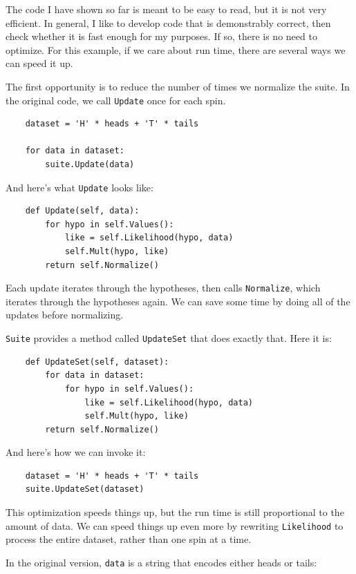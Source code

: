 \documentclass[12pt]{book}
\begin{document}
The code I have shown so far is meant to be easy to read, but it
is not very efficient.  In general, I like to develop code that
is demonstrably correct, then check whether it is fast enough for
my purposes.  If so, there is no need to optimize.
For this example, if we care about run time,
there are several ways we can speed it up.

The first opportunity is to reduce the number of times we
normalize the suite.
In the original code, we call \verb"Update" once for each spin.

\begin{verbatim}
    dataset = 'H' * heads + 'T' * tails

    for data in dataset:
        suite.Update(data)
\end{verbatim}

And here's what \verb"Update" looks like:

\begin{verbatim}
    def Update(self, data):
        for hypo in self.Values():
            like = self.Likelihood(hypo, data)
            self.Mult(hypo, like)
        return self.Normalize()
\end{verbatim}

Each update iterates through the hypotheses, then calls \verb"Normalize",
which iterates through the hypotheses again.  We can save some
time by doing all of the updates before normalizing.

\verb"Suite" provides a method called \verb"UpdateSet" that does
exactly that.  Here it is:

\begin{verbatim}
    def UpdateSet(self, dataset):
        for data in dataset:
            for hypo in self.Values():
                like = self.Likelihood(hypo, data)
                self.Mult(hypo, like)
        return self.Normalize()
\end{verbatim}

And here's how we can invoke it:

\begin{verbatim}
    dataset = 'H' * heads + 'T' * tails
    suite.UpdateSet(dataset)
\end{verbatim}

This optimization speeds things up, but the run time is still
proportional to the amount of data.  We can speed things up
even more by rewriting \verb"Likelihood" to process the entire
dataset, rather than one spin at a time.

In the original version,
\verb"data" is a string that encodes either heads or tails:
\end{document}
